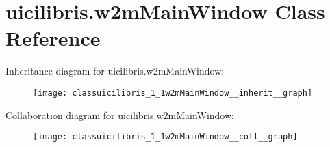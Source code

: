 \hypertarget{classuicilibris_1_1w2mMainWindow}{\section{uicilibris.\-w2m\-Main\-Window \-Class \-Reference}
\label{classuicilibris_1_1w2mMainWindow}
}


\-Inheritance diagram for uicilibris.\-w2m\-Main\-Window\-:
\nopagebreak
\begin{figure}[H]
\begin{center}
\leavevmode
\texttt{[image: classuicilibris\_1\_1w2mMainWindow\_\_inherit\_\_graph]}
\end{center}
\end{figure}


\-Collaboration diagram for uicilibris.\-w2m\-Main\-Window\-:
\nopagebreak
\begin{figure}[H]
\begin{center}
\leavevmode
\texttt{[image: classuicilibris\_1\_1w2mMainWindow\_\_coll\_\_graph]}
\end{center}
\end{figure}
